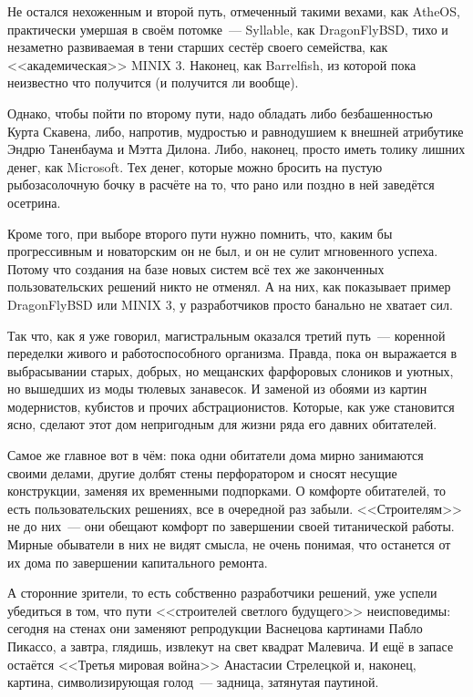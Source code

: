 Не остался нехоженным и второй путь, отмеченный такими вехами, как AtheOS, практически умершая в своём потомке~--- Syllable, как DragonFlyBSD, тихо и незаметно развиваемая в тени старших сестёр своего семейства, как <<академическая>> MINIX 3. Наконец, как Barrelfish, из которой пока неизвестно что получится (и получится ли вообще).

Однако, чтобы пойти по второму пути, надо обладать либо безбашенностью Курта Скавена, либо, напротив, мудростью и равнодушием к внешней атрибутике Эндрю Таненбаума и Мэтта Дилона. Либо, наконец, просто иметь толику лишних денег, как Microsoft. Тех денег, которые можно бросить на пустую рыбозасолочную бочку в расчёте на то, что рано или поздно в ней заведётся осетрина.

Кроме того, при выборе второго пути нужно помнить, что, каким бы прогрессивным и новаторским он не был, и он не сулит мгновенного успеха. Потому что создания на базе новых систем всё тех же законченных пользовательских решений никто не отменял. А на них, как показывает пример DragonFlyBSD или MINIX 3, у разработчиков просто банально не хватает сил.

Так что, как я уже говорил, магистральным оказался третий путь~--- коренной переделки живого и работоспособного организма. Правда, пока он выражается в выбрасывании старых, добрых, но мещанских фарфоровых слоников и уютных, но вышедших из моды тюлевых занавесок. И заменой из обоями из картин модернистов, кубистов и прочих абстрационистов. Которые, как уже становится ясно, сделают этот дом непригодным для жизни ряда его давних обитателей.

Самое же главное вот в чём: пока одни обитатели дома мирно занимаются своими делами, другие долбят стены перфоратором и сносят несущие конструкции, заменяя их временными подпорками. О комфорте обитателей, то есть пользовательских решениях, все в очередной раз забыли. <<Строителям>> не до них~--- они обещают комфорт по завершении своей титанической работы. Мирные обыватели в них не видят смысла, не очень понимая, что останется от их дома по завершении капитального ремонта.

А сторонние зрители, то есть собственно разработчики решений, уже успели убедиться в том, что пути <<строителей светлого будущего>> неисповедимы: сегодня на стенах они заменяют репродукции Васнецова картинами Пабло Пикассо, а завтра, глядишь, извлекут на свет квадрат Малевича. И ещё в запасе остаётся <<Третья мировая война>> Анастасии Стрелецкой и, наконец, картина, символизирующая голод~--- задница, затянутая паутиной.

